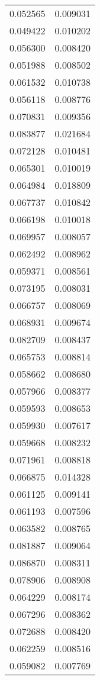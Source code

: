 \begin{longtable}[c]{ll}
    0.052565 & 0.009031 \\
    0.049422 & 0.010202 \\
    0.056300 & 0.008420 \\
    0.051988 & 0.008502 \\
    0.061532 & 0.010738 \\
    0.056118 & 0.008776 \\
    0.070831 & 0.009356 \\
    0.083877 & 0.021684 \\
    0.072128 & 0.010481 \\
    0.065301 & 0.010019 \\
    0.064984 & 0.018809 \\
    0.067737 & 0.010842 \\
    0.066198 & 0.010018 \\
    0.069957 & 0.008057 \\
    0.062492 & 0.008962 \\
    0.059371 & 0.008561 \\
    0.073195 & 0.008031 \\
    0.066757 & 0.008069 \\
    0.068931 & 0.009674 \\
    0.082709 & 0.008437 \\
    0.065753 & 0.008814 \\
    0.058662 & 0.008680 \\
    0.057966 & 0.008377 \\
    0.059593 & 0.008653 \\
    0.059930 & 0.007617 \\
    0.059668 & 0.008232 \\
    0.071961 & 0.008818 \\
    0.066875 & 0.014328 \\
    0.061125 & 0.009141 \\
    0.061193 & 0.007596 \\
    0.063582 & 0.008765 \\
    0.081887 & 0.009064 \\
    0.086870 & 0.008311 \\
    0.078906 & 0.008908 \\
    0.064229 & 0.008174 \\
    0.067296 & 0.008362 \\
    0.072688 & 0.008420 \\
    0.062259 & 0.008516 \\
    0.059082 & 0.007769 \\

\end{longtable}
